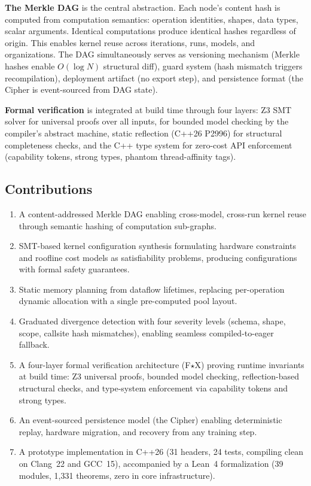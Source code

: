 \textbf{The Merkle DAG} is the central abstraction.
Each node's content hash is computed from computation semantics: operation identities, shapes, data types, scalar arguments.
Identical computations produce identical hashes regardless of origin.
This enables kernel reuse across iterations, runs, models, and organizations.
The DAG simultaneously serves as versioning mechanism (Merkle hashes enable $O(\log N)$ structural diff), guard system (hash mismatch triggers recompilation), deployment artifact (no export step), and persistence format (the Cipher is event-sourced from DAG state).

\textbf{Formal verification} is integrated at build time through four layers: Z3 SMT solver for universal proofs over all inputs,  for bounded model checking by the compiler's abstract machine, static reflection (C++26 P2996) for structural completeness checks, and the C++ type system for zero-cost API enforcement (capability tokens, strong types, phantom thread-affinity tags).

\subsection{Contributions}

\begin{enumerate}
  \item A content-addressed Merkle DAG enabling cross-model, cross-run kernel reuse through semantic hashing of computation sub-graphs.
  \item SMT-based kernel configuration synthesis formulating hardware constraints and roofline cost models as satisfiability problems, producing configurations with formal safety guarantees.
  \item Static memory planning from dataflow lifetimes, replacing per-operation dynamic allocation with a single pre-computed pool layout.
  \item Graduated divergence detection with four severity levels (schema, shape, scope, callsite hash mismatches), enabling seamless compiled-to-eager fallback.
  \item A four-layer formal verification architecture (F$\star$X) proving runtime invariants at build time: Z3 universal proofs,  bounded model checking, reflection-based structural checks, and type-system enforcement via capability tokens and strong types.
  \item An event-sourced persistence model (the Cipher) enabling deterministic replay, hardware migration, and recovery from any training step.
  \item A prototype implementation in C++26 (31 headers, 24 tests, compiling clean on Clang~22 and GCC~15), accompanied by a Lean~4 formalization (39 modules, 1,331 theorems, zero  in core infrastructure).
\end{enumerate}

